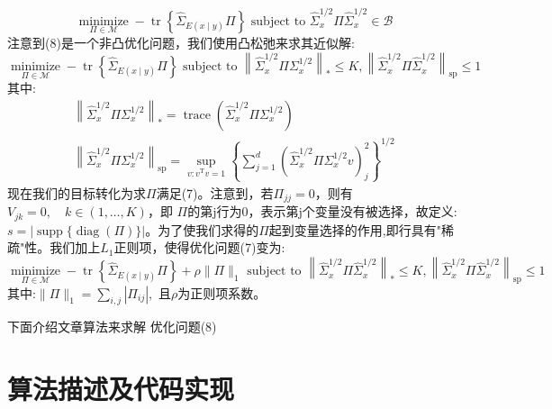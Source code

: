 \documentclass[lang=cn,11pt,a4paper]{elegantpaper}
\begin{document}
\begin{equation}
    \underset{\Pi \in \mathcal{M}}{\operatorname{minimize}}-\operatorname{tr}\left\{\hat{\Sigma}_{E(x \mid y)} \Pi\right\} \text { subject to } \hat{\Sigma}_{x}^{1 / 2} \Pi \hat{\Sigma}_{x}^{1 / 2} \in \mathcal{B}
\end{equation}
注意到(8)是一个非凸优化问题，我们使用凸松弛来求其近似解:
\begin{equation}
    \underset{\Pi \in \mathcal{M}}{\operatorname{minimize}}-\operatorname{tr}\left\{\hat{\Sigma}_{E(x \mid y)} \Pi\right\} \text { subject to }\left\|\hat{\Sigma}_{x}^{1 / 2} \Pi \Sigma_{x}^{1 / 2}\right\|_{*} \leqslant K,\left\|\hat{\Sigma}_{x}^{1 / 2} \Pi \hat{\Sigma}_{x}^{1 / 2}\right\|_{\mathrm{sp}} \leqslant 1
\end{equation}
其中:
$$
\begin{array}{l}
\left\|\hat{\Sigma}_{x}^{1 / 2} \Pi \Sigma_{x}^{1 / 2}\right\|_{*}=\operatorname{trace}\left(\hat{\Sigma}_{x}^{1 / 2} \Pi \Sigma_{x}^{1 / 2}\right) \\
\left\|\hat{\Sigma}_{x}^{1 / 2} \Pi \Sigma_{x}^{1 / 2}\right\|_{\mathrm{sp}}=\sup _{v: v^{\mathrm{T}} v=1}\left\{\sum_{j=1}^{d}\left(\hat{\Sigma}_{x}^{1 / 2} \Pi \Sigma_{x}^{1 / 2} v\right)_{j}^{2}\right\}^{1 / 2}
\end{array}
$$
现在我们的目标转化为求$ \Pi$满足(7)。注意到，若$\Pi_{j j}=0$，则有$V_{j k}=0, \quad k \in(1, \ldots, K)$，\newline 即 $  \Pi$的第j行为0，表示第j个变量没有被选择，故定义:$s=|\operatorname{supp}\{\operatorname{diag}(\Pi)\}|$。为了使我们求得的$ \Pi$起到变量选择的作用,即行具有"稀疏"性。我们加上$ L_1$正则项，使得优化问题(7)变为: \newline
\begin{equation}
    \underset{\Pi \in \mathcal{M}}{\operatorname{minimize}}-\operatorname{tr}\left\{\hat{\Sigma}_{E(x \mid y)} \Pi\right\}+\rho\|\Pi\|_{1} \text { subject to }\left\|\hat{\Sigma}_{x}^{1 / 2} \Pi \hat{\Sigma}_{x}^{1 / 2}\right\|_{*} \leqslant K,\left\|\hat{\Sigma}_{x}^{1 / 2} \Pi \hat{\Sigma}_{x}^{1 / 2}\right\|_{\mathrm{sp}} \leqslant 1
\end{equation}
其中:$\|\Pi\|_{1}=\sum_{i, j}\left|\Pi_{i j}\right|,$ 且$ \rho $为正则项系数。

下面介绍文章算法来求解 优化问题(8)

\section{算法描述及代码实现}
\end{document}
